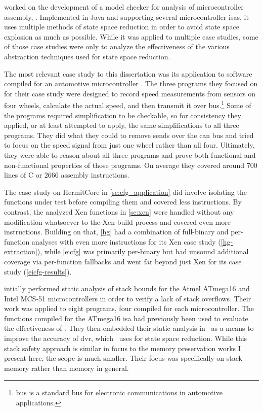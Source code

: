 \Textcite{schlich2008phd} worked on the development of a model checker for analysis
of microcontroller assembly, \mcsquare.
Implemented in Java and supporting several microcontroller \acp{isa},
it uses multiple methods of state space reduction in order to avoid state space explosion
as much as possible. While it was applied to multiple case studies,
some of those case studies were only to analyze the effectiveness
of the various abstraction techniques used for state space reduction.

The most relevant case study to this dissertation was its application
to software compiled for an automotive microcontroller \autocite{schlich2007automotive}.
The three programs they focused on for their case study
were designed to record speed measurements from sensors on four wheels,
calculate the actual speed, and then transmit it over  bus.\footnote{%
   bus is a standard bus for electronic communications
  in automotive applications. %
}
Some of the programs required simplification to be checkable,
so for consistency they applied, or at least attempted to apply,
the same simplifications to all three programs.
They did what they could to remove sends over the \ac{can} bus
and tried to focus on the speed signal from just one wheel rather than all four.
Ultimately, they were able to reason about all three programs
and prove both functional and non-functional properties of those programs.
On average they covered around \num{700} lines of C or \num{2666} assembly instructions.
\begin{remark}
  The case study on HermitCore in \cref{se:cfg_application} did involve isolating the functions under test before compiling them and covered less instructions.
  By contrast, the analyzed Xen functions in \cref{se:xen} were handled without any modification whatsoever to the Xen build process and covered even more instructions.
  Building on that, \cref{hg} had a combination of full-binary and per-function analyses with even more instructions for its Xen case study (\cref{hg-extraction}), while \cref{eicfg} was primarily per-binary but had unsound additional coverage via per-function fallbacks and went far beyond just Xen for its case study (\cref{eicfg-results}).
\end{remark}

\Textcite{brauer2009sba} intially performed static analysis of stack bounds
for the Atmel ATmega16 and Intel MCS-51 microcontrollers
in order to verify a lack of stack overflows.
Their work was applied to eight programs, four compiled for each microcontroller.
The functions compiled for the ATmega16 \ac{isa}
had previously been used to evaluate the effectiveness of \mcsquare.
They then embedded their static analysis in \mcsquare\ as a means to
improve the accuracy of \ac{dvr}, which \mcsquare\ uses for state space reduction.
While this stack safety approach is similar in focus to the memory preservation works
I present here, the scope is much smaller.
Their focus was specifically on stack memory rather than memory in general.

